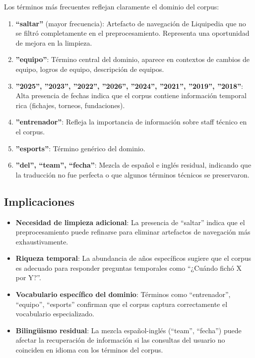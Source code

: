 Los términos más frecuentes reflejan claramente el dominio del corpus:

\begin{enumerate}
    \item \textbf{``saltar''} (mayor frecuencia): Artefacto de navegación de Liquipedia que no se filtró completamente en el preprocesamiento. Representa una oportunidad de mejora en la limpieza.
    
    \item \textbf{''equipo''}: Término central del dominio, aparece en contextos de cambios de equipo, logros de equipo, descripción de equipos.
    
    \item \textbf{''2025'', ''2023'', ''2022'', ''2026'', ''2024'', ''2021'', ''2019'', ''2018''}: Alta presencia de fechas indica que el corpus contiene información temporal rica (fichajes, torneos, fundaciones).
    
    \item \textbf{''entrenador''}: Refleja la importancia de información sobre staff técnico en el corpus.
    
    \item \textbf{''esports''}: Término genérico del dominio.
    
    \item \textbf{''del'', ``team'', ``fecha''}: Mezcla de español e inglés residual, indicando que la traducción no fue perfecta o que algunos términos técnicos se preservaron.
\end{enumerate}

\subsection{Implicaciones}

\begin{itemize}
    \item \textbf{Necesidad de limpieza adicional}: La presencia de ``saltar'' indica que el preprocesamiento puede refinarse para eliminar artefactos de navegación más exhaustivamente.
    
    \item \textbf{Riqueza temporal}: La abundancia de años específicos sugiere que el corpus es adecuado para responder preguntas temporales como ``¿Cuándo fichó X por Y?''.
    
    \item \textbf{Vocabulario específico del dominio}: Términos como ``entrenador'', ``equipo'', ``esports'' confirman que el corpus captura correctamente el vocabulario especializado.
    
    \item \textbf{Bilingüismo residual}: La mezcla español-inglés (``team'', ``fecha'') puede afectar la recuperación de información si las consultas del usuario no coinciden en idioma con los términos del corpus.
\end{itemize}

